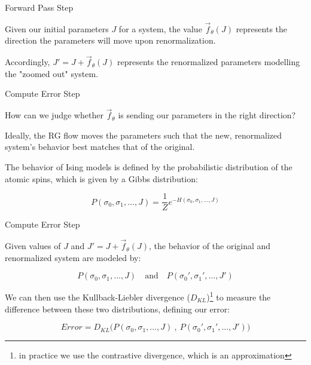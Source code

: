 \documentclass[aspectratio=169, 12pt]{beamer}
\begin{document}
\begin{frame}{Forward Pass Step}

    Given our initial parameters $J$ for a system, the value $\vec{f}_\theta(J)$ represents the direction the parameters will move upon renormalization. 

    \vspace{1em}

    Accordingly, $J' = J + \vec{f}_\theta(J)$ represents the renormalized parameters modelling the "zoomed out" system. 

\end{frame}

\begin{frame}{Compute Error Step}

    How can we judge whether $\vec{f}_\theta$ is sending our parameters in the right direction?

    \vspace{1em}

    Ideally, the RG flow moves the parameters such that the new, renormalized system's behavior best matches that of the original. 

    \vspace{1em}

    The behavior of Ising models is defined by the probabilistic distribution of the atomic spins, which is given by a Gibbs distribution:

    \[
    P(\sigma_0, \sigma_1, \dots, J) = \frac{1}{Z} e^{-H(\sigma_0, \sigma_1, \dots, J)}
    \]

\end{frame}

\begin{frame}{Compute Error Step}

    Given values of $J$ and $J' = J + \vec{f}_\theta(J)$, the behavior of the original and renormalized system are modeled by:

    \[
    P(\sigma_0, \sigma_1, \dots, J) 
    \quad \text{and} \quad
    P(\sigma_0', \sigma_1', \dots, J') 
    \]

    We can then use the Kullback-Liebler divergence ($D_{KL}$)\footnote{in practice we use the contrastive divergence, which is an approximation} to measure the difference between these two distributions, defining our error:

    \[
    Error = D_{KL} \Biggr (
    P(\sigma_0, \sigma_1, \dots, J)
    \: , \: 
    P(\sigma_0', \sigma_1', \dots, J') 
    \Biggr)
    \]

\end{frame}
\end{document}
